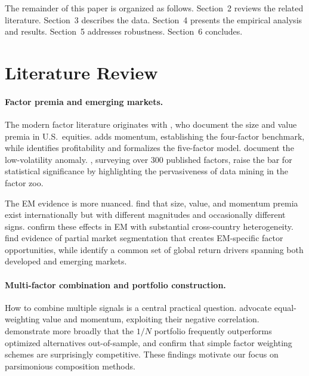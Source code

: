 \documentclass[12pt]{article}
\begin{document}
The remainder of this paper is organized as follows. Section~2 reviews the related literature. Section~3 describes the data. Section~4 presents the empirical analysis and results. Section~5 addresses robustness. Section~6 concludes.


\section{Literature Review}

\paragraph{Factor premia and emerging markets.} The modern factor literature originates with \citet{famafrench1993}, who document the size and value premia in U.S.\ equities. \citet{carhart1997} adds momentum, establishing the four-factor benchmark, while \citet{novymarx2013} identifies profitability and \citet{famafrench2015} formalizes the five-factor model. \citet{ang2006} document the low-volatility anomaly. \citet{harvey2016}, surveying over 300 published factors, raise the bar for statistical significance by highlighting the pervasiveness of data mining in the factor zoo.

The EM evidence is more nuanced. \citet{famafrench2012} find that size, value, and momentum premia exist internationally but with different magnitudes and occasionally different signs. \citet{cakici2013} confirm these effects in EM with substantial cross-country heterogeneity. \citet{hanauer2015} find evidence of partial market segmentation that creates EM-specific factor opportunities, while \citet{hou2011} identify a common set of global return drivers spanning both developed and emerging markets.

\paragraph{Multi-factor combination and portfolio construction.} How to combine multiple signals is a central practical question. \citet{asness2013} advocate equal-weighting value and momentum, exploiting their negative correlation. \citet{demiguel2009} demonstrate more broadly that the $1/N$ portfolio frequently outperforms optimized alternatives out-of-sample, and \citet{green2017} confirm that simple factor weighting schemes are surprisingly competitive. These findings motivate our focus on parsimonious composition methods.
\end{document}
